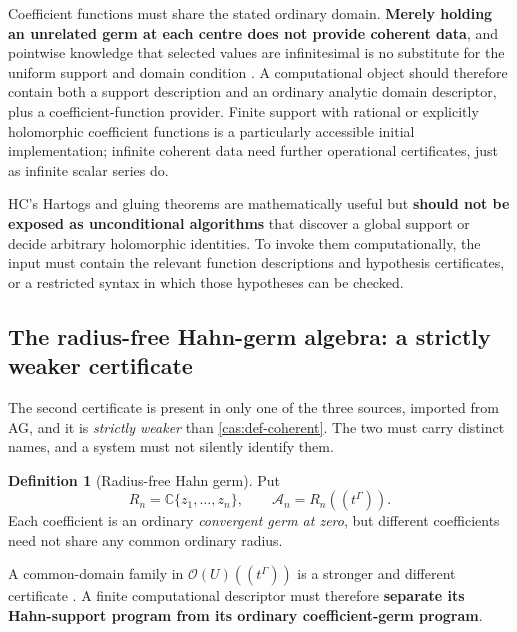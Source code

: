 \documentclass[11pt,letterpaper]{article}
\numberwithin{equation}{section}
\theoremstyle{definition}
\newtheorem{definition}[theorem]{Definition}
\theoremstyle{remark}
\newcommand{\C}{\mathbb C}
\newcommand{\OO}{\mathcal O}
\newcommand{\Acal}{\mathscr A}
\begin{document}
Coefficient functions must share the stated ordinary domain. \textbf{Merely
holding an unrelated germ at each centre does not provide coherent data}, and
pointwise knowledge that selected values are infinitesimal is no substitute for
the uniform support and domain condition
\cite{cas:SourceAnalysisThree,cas:SourceResearch}. A computational object should
therefore contain both a support description and an ordinary analytic domain
descriptor, plus a coefficient-function provider. Finite support with rational
or explicitly holomorphic coefficient functions is a particularly accessible
initial implementation; infinite coherent data need further operational
certificates, just as infinite scalar series do.

HC's Hartogs and gluing theorems are mathematically useful but \textbf{should
not be exposed as unconditional algorithms} that discover a global support or
decide arbitrary holomorphic identities. To invoke them computationally, the
input must contain the relevant function descriptions and hypothesis
certificates, or a restricted syntax in which those hypotheses can be checked.

\subsection{The radius-free Hahn-germ algebra: a strictly weaker certificate}
\label{cas:sub-radiusfree}
The second certificate is present in only one of the three sources, imported
from AG, and it is \emph{strictly weaker} than
\cref{cas:def-coherent}. The two must carry distinct names, and a system must
not silently identify them.

\begin{definition}[Radius-free Hahn germ]\label{cas:def-radiusfree}
Put
\begin{equation}\label{cas:eq-germalgebra}
 R_n=\C\{z_1,\dots,z_n\},\qquad \Acal_n=R_n((t^\Gamma)).
\end{equation}
Each coefficient is an ordinary \emph{convergent germ at zero}, but different
coefficients need not share any common ordinary radius.
\end{definition}

A common-domain family in $\OO(U)((t^\Gamma))$ is a stronger and different
certificate \cite{cas:SourceAG}. A finite computational descriptor must
therefore \textbf{separate its Hahn-support program from its ordinary
coefficient-germ program}.
\end{document}

